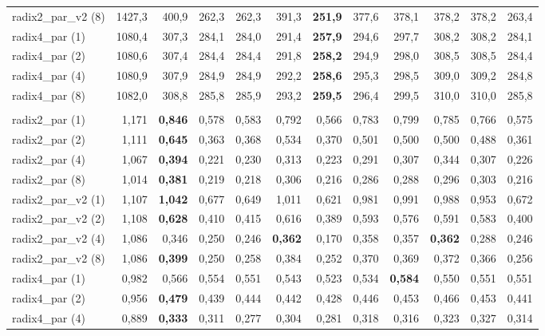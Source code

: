 \begin{table}[H]
\begin{tabular}{lrrrrrrrrrrr}
radix2\_par\_v2 (8) & 1427,3 & 400,9 & 262,3 & 262,3 & 391,3 & \textbf{251,9} & 377,6 & 378,1 & 378,2 & 378,2 & 263,4 \\
\addlinespace
radix4\_par (1) & 1080,4 & 307,3 & 284,1 & 284,0 & 291,4 & \textbf{257,9} & 294,6 & 297,7 & 308,2 & 308,2 & 284,1 \\
radix4\_par (2) & 1080,6 & 307,4 & 284,4 & 284,4 & 291,8 & \textbf{258,2} & 294,9 & 298,0 & 308,5 & 308,5 & 284,4 \\
radix4\_par (4) & 1080,9 & 307,9 & 284,9 & 284,9 & 292,2 & \textbf{258,6} & 295,3 & 298,5 & 309,0 & 309,2 & 284,8 \\
radix4\_par (8) & 1082,0 & 308,8 & 285,8 & 285,9 & 293,2 & \textbf{259,5} & 296,4 & 299,5 & 310,0 & 310,0 & 285,8 \\
\addlinespace
\multicolumn{12}{l}{\textit{Liczba instrukcji na cykl (IPC)}} \\[2pt]
radix2\_par (1) & 1,171 & \textbf{0,846} & 0,578 & 0,583 & 0,792 & 0,566 & 0,783 & 0,799 & 0,785 & 0,766 & 0,575 \\
radix2\_par (2) & 1,111 & \textbf{0,645} & 0,363 & 0,368 & 0,534 & 0,370 & 0,501 & 0,500 & 0,500 & 0,488 & 0,361 \\
radix2\_par (4) & 1,067 & \textbf{0,394} & 0,221 & 0,230 & 0,313 & 0,223 & 0,291 & 0,307 & 0,344 & 0,307 & 0,226 \\
radix2\_par (8) & 1,014 & \textbf{0,381} & 0,219 & 0,218 & 0,306 & 0,216 & 0,286 & 0,288 & 0,296 & 0,303 & 0,216 \\
\addlinespace
radix2\_par\_v2 (1) & 1,107 & \textbf{1,042} & 0,677 & 0,649 & 1,011 & 0,621 & 0,981 & 0,991 & 0,988 & 0,953 & 0,672 \\
radix2\_par\_v2 (2) & 1,108 & \textbf{0,628} & 0,410 & 0,415 & 0,616 & 0,389 & 0,593 & 0,576 & 0,591 & 0,583 & 0,400 \\
radix2\_par\_v2 (4) & 1,086 & 0,346 & 0,250 & 0,246 & \textbf{0,362} & 0,170 & 0,358 & 0,357 & \textbf{0,362} & 0,288 & 0,246 \\
radix2\_par\_v2 (8) & 1,086 & \textbf{0,399} & 0,250 & 0,258 & 0,384 & 0,252 & 0,370 & 0,369 & 0,372 & 0,366 & 0,256 \\
\addlinespace
radix4\_par (1) & 0,982 & 0,566 & 0,554 & 0,551 & 0,543 & 0,523 & 0,534 & \textbf{0,584} & 0,550 & 0,551 & 0,551 \\
radix4\_par (2) & 0,956 & \textbf{0,479} & 0,439 & 0,444 & 0,442 & 0,428 & 0,446 & 0,453 & 0,466 & 0,453 & 0,441 \\
radix4\_par (4) & 0,889 & \textbf{0,333} & 0,311 & 0,277 & 0,304 & 0,281 & 0,318 & 0,316 & 0,323 & 0,327 & 0,314 \\

\end{tabular}
\end{table}
